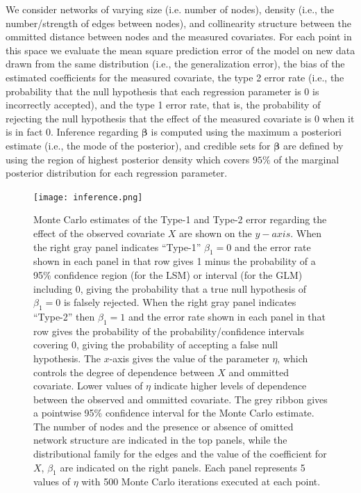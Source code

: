 \documentclass[12pt]{article}
\begin{document}
We consider networks of varying size (i.e. number of nodes), density (i.e., the number/strength of edges between nodes), and collinearity structure between the ommitted distance between nodes and the measured covariates. For each point in this space we evaluate the mean square prediction error of the model on new data drawn from the same distribution (i.e., the generalization error), the bias of the estimated coefficients for the measured covariate, the type 2 error rate (i.e., the probability that the null hypothesis that each regression parameter is $0$ is incorrectly accepted), and the type 1 error rate, that is, the probability of rejecting the null hypothesis that the effect of the measured covariate is 0 when it is in fact 0. Inference regarding $\boldsymbol\beta$ is computed using the maximum a posteriori estimate (i.e., the mode of the posterior), and credible sets for $\boldsymbol\beta$ are defined by using the region of highest posterior density which covers $95\%$ of the marginal posterior distribution for each regression parameter.

\begin{figure}
\texttt{[image: inference.png]}
\caption{Monte Carlo estimates of the Type-1 and Type-2 error regarding the effect of the observed covariate $X$ are shown on the $y-axis$. When the right gray panel indicates ``Type-1'' $\beta_1 = 0$ and the error rate shown in each panel in that row gives 1 minus the probability of a 95\% confidence region (for the LSM) or interval (for the GLM) including $0$, giving the probability that a true null hypothesis of $\beta_1 = 0$ is falsely rejected. When the right gray panel indicates ``Type-2'' then $\beta_1 = 1$ and the error rate shown in each panel in that row gives the probability of the probability/confidence intervals covering $0$, giving the probability of accepting a false null hypothesis. The $x$-axis gives the value of the parameter $\eta$, which controls the degree of dependence between $X$ and ommitted covariate. Lower values of $\eta$ indicate higher levels of dependence between the observed and ommitted covariate. The grey ribbon gives a pointwise 95\% confidence interval for the Monte Carlo estimate. The number of nodes and the presence or absence of omitted network structure are indicated in the top panels, while the distributional family for the edges and the value of the coefficient for $X$, $\beta_1$ are indicated on the right panels. Each panel represents 5 values of $\eta$ with 500 Monte Carlo iterations executed at each point. \label{fig:inference}}
\end{figure}
\end{document}
